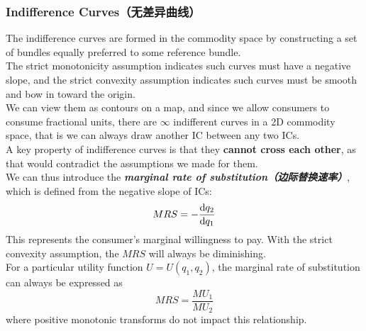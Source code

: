 \subsubsection{Indifference Curves（无差异曲线）}
The indifference curves are formed in the commodity space by constructing a set of bundles equally preferred to some reference bundle. \\
The strict monotonicity assumption indicates such curves must have a negative slope, and the strict convexity assumption indicates such curves must be smooth and bow in toward the origin. \\
We can view them as contours on a map, and since we allow consumers to consume fractional units, there are $\infty$ indifferent curves in a 2D commodity space, that is we can always draw another IC between any two ICs. \\
A key property of indifference curves is that they \textbf{cannot cross each other}, as that would contradict the assumptions we made for them. \\
We can thus introduce the \textbf{\textit{marginal rate of substitution（边际替换速率）}}, which is defined from the negative slope of ICs:
$$MRS = -\dv{q_2}{q_1}$$
This represents the consumer's marginal willingness to pay. With the strict convexity assumption, the $MRS$ will always be diminishing. \\
For a particular utility function $U = U(q_1, q_2)$, the marginal rate of substitution can always be expressed as
$$MRS = \frac{MU_1}{MU_2}$$
where positive monotonic transforms do not impact this relationship.

